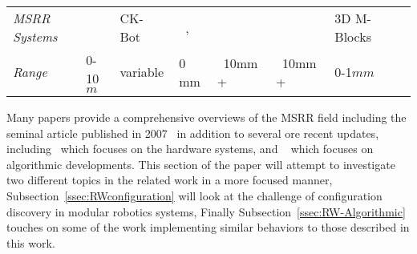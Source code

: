 \begin{table*}[t]
\begin{tabular}{ p{2.4 cm} p{\wdd}  p{\wdd} p{\wdd} p{\wdd} p{\wdd} p{\wdd} p{\wdd}  }
		\addlinespace[1ex] 	\textit{MSRR Systems}
		& ~\cite{StigmergyWerfel2006}	%
		& CK-Bot~\cite{park2008automatic}					%
		& ~\cite{Soldercubes2016}, ~\cite{ubot-Zhu-2014}	%
		& ~\cite{lin2017vision}								%
		& ~\cite{TosunDaveyLiuYim-IROS2016}					%
		& 3D M-Blocks~\cite{Romanishin20153d}	\\ 			%
		
		\addlinespace[1ex] 	\textit{Range}			& 0-10$m$			& variable				& 0 mm				& ~10mm +			& ~10mm +			& 0-1$mm$	\\
	\end{tabular}
	\label{tab:tagTech}
\end{table*}


Many papers provide a comprehensive overviews of the MSRR field including the seminal article published in 2007~\cite{Yim-RAM07} in addition to several ore recent updates, including~\cite{chennareddy2017modular} which focuses on the hardware systems, and ~\cite{abukhalil2013survey} which focuses on algorithmic developments. This section of the paper will attempt to investigate two different topics in the related work in a more focused manner, Subsection~\ref{ssec:RWconfiguration} will look at the challenge of configuration discovery in modular robotics systems, Finally Subsection~\ref{ssec:RW-Algorithmic} touches on some of the work implementing similar behaviors to those described in this work.

